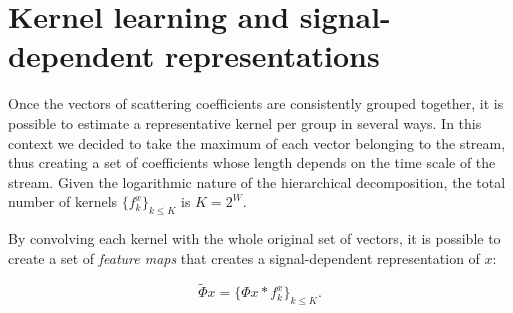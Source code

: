 \documentclass[twoside]{article}
\begin{document}
\section{Kernel learning and signal-dependent representations}
\label{sec:kern_learn}

Once the vectors of scattering coefficients are consistently grouped together, it is possible to estimate a representative kernel per group in several
ways. In this context we decided to take the maximum of each vector belonging to the stream, thus creating a set of coefficients whose length depends
on the time scale of the stream. Given the logarithmic nature of the hierarchical decomposition, the total number of kernels $ {\{f^x_k\}}_{k \leq K}$ is $K = 2^W$.

By convolving each kernel with the whole original set of vectors, it is possible to create a set of \emph{feature maps} that creates a signal-dependent 
representation of $x$:

\begin{equation}
  \label{eq:sig_dep_rep}
  \tilde{\Phi}x = {\{ \Phi x * f^x_k\}}_{k \leq K}.
\end{equation}
\end{document}
